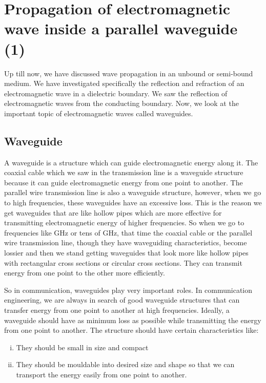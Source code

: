 \chapter{Propagation of electromagnetic wave inside a parallel waveguide (1)}
Up till now, we have discussed wave propagation in an unbound or semi-bound medium. We have investigated specifically the reflection and refraction of an electromagnetic wave in a dielectric boundary. We saw the reflection of electromagnetic waves from the conducting boundary. Now, we look at the important topic of electromagnetic waves called waveguides. 

\section{Waveguide}
A waveguide is a structure which can guide electromagnetic energy along it. The coaxial cable which we saw in the transmission line is a waveguide structure because it can guide electromagnetic energy from one point to another. The parallel wire transmission line is also a waveguide structure, however, when we go to high frequencies, these waveguides have an excessive loss. This is the reason we get waveguides that are like hollow pipes which are more effective for transmitting electromagnetic energy of higher frequencies. So when we go to frequencies like GHz or tens of GHz, that time the coaxial cable or the parallel wire transmission line, though they have waveguiding characteristics, become lossier and then we stand getting waveguides that look more like hollow pipes with rectangular cross sections or circular cross sections. They can transmit energy from one point to the other more efficiently.

So in communication, waveguides play very important roles. In communication engineering, we are always in search of good waveguide structures that can transfer energy from one point to another at high frequencies. Ideally, a waveguide should have as minimum loss as possible while transmitting the energy from one point to another. The structure should have certain characteristics like:
\begin{enumerate}[(i)]
\item They should be small in size and compact
\item They should be mouldable into desired size and shape so that we can transport the energy easily from one point to another.
\end{enumerate}

